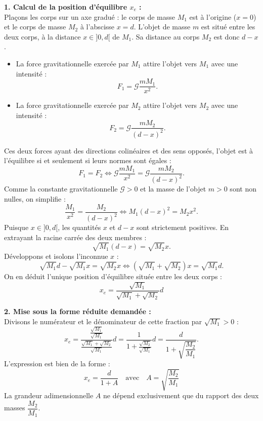\documentclass[11pt,a4paper]{article}
\begin{document}
\begin{correctionbox}
\textbf{1. Calcul de la position d'équilibre $x_e$ :}\\
Plaçons les corps sur un axe gradué : le corps de masse $M_1$ est à l'origine ($x = 0$) et le corps de masse $M_2$ à l'abscisse $x = d$. L'objet de masse $m$ est situé entre les deux corps, à la distance $x \in ]0, d[$ de $M_1$.
Sa distance au corps $M_2$ est donc $d - x$.
\begin{itemize}[leftmargin=*,label=\textbullet]
    \item La force gravitationnelle exercée par $M_1$ attire l'objet vers $M_1$ avec une intensité :
    \[
    F_1 = \mathcal{G} \frac{m M_1}{x^2}.
    \]
    \item La force gravitationnelle exercée par $M_2$ attire l'objet vers $M_2$ avec une intensité :
    \[
    F_2 = \mathcal{G} \frac{m M_2}{(d - x)^2}.
    \]
\end{itemize}
Ces deux forces ayant des directions colinéaires et des sens opposés, l'objet est à l'équilibre si et seulement si leurs normes sont égales :
\[
F_1 = F_2 \iff \mathcal{G} \frac{m M_1}{x^2} = \mathcal{G} \frac{m M_2}{(d - x)^2}.
\]
Comme la constante gravitationnelle $\mathcal{G} > 0$ et la masse de l'objet $m > 0$ sont non nulles, on simplifie :
\[
\frac{M_1}{x^2} = \frac{M_2}{(d - x)^2} \iff M_1 (d - x)^2 = M_2 x^2.
\]
Puisque $x \in ]0, d[$, les quantités $x$ et $d - x$ sont strictement positives. En extrayant la racine carrée des deux membres :
\[
\sqrt{M_1}(d - x) = \sqrt{M_2} x.
\]
Développons et isolons l'inconnue $x$ :
\[
\sqrt{M_1} d - \sqrt{M_1} x = \sqrt{M_2} x \iff (\sqrt{M_1} + \sqrt{M_2})x = \sqrt{M_1} d.
\]
On en déduit l'unique position d'équilibre située entre les deux corps :
\[
\boxed{x_e = \frac{\sqrt{M_1}}{\sqrt{M_1} + \sqrt{M_2}} d}
\]

\textbf{2. Mise sous la forme réduite demandée :}\\
Divisons le numérateur et le dénominateur de cette fraction par $\sqrt{M_1} > 0$ :
\[
x_e = \frac{\frac{\sqrt{M_1}}{\sqrt{M_1}}}{\frac{\sqrt{M_1} + \sqrt{M_2}}{\sqrt{M_1}}} d = \frac{1}{1 + \frac{\sqrt{M_2}}{\sqrt{M_1}}} d = \frac{d}{1 + \sqrt{\dfrac{M_2}{M_1}}}.
\]
L'expression est bien de la forme :
\[
\boxed{x_e = \frac{d}{1 + A} \quad \text{avec} \quad A = \sqrt{\frac{M_2}{M_1}}}
\]
La grandeur adimensionnelle $A$ ne dépend exclusivement que du rapport des deux masses $\dfrac{M_2}{M_1}$.
\end{correctionbox}

\end{document}
